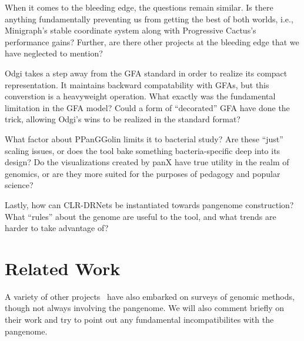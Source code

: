 \documentclass[acmsmall, screen]{acmart}
\begin{document}
When it comes to the bleeding edge, the questions remain similar.
Is there anything fundamentally preventing us from getting the best of both worlds, i.e., Minigraph's stable coordinate system along with Progressive Cactus's performance gains?
Further, are there other projects at the bleeding edge that we have neglected to mention?

Odgi takes a step away from the GFA standard in order to realize its compact representation.
It maintains backward compatability with GFAs, but this converstion is a heavyweight operation.
What exactly was the fundamental limitation in the GFA model?
Could a form of ``decorated'' GFA have done the trick, allowing Odgi's wins to be realized in the standard format?

What factor about PPanGGolin limits it to bacterial study?
Are these ``just'' scaling issues, or does the tool bake something bacteria-specific deep into its design? Do the visualizations created by panX have true utility in the realm of genomics, or are they more suited for the purposes of pedagogy and popular science?

Lastly, how can CLR-DRNets be instantiated towards pangenome construction?
What ``rules'' about the genome are useful to the tool, and what trends are harder to take advantage of?

\section{Related Work}

A variety of other projects~\cite{sailfish, alexandrov,omichessan} have also embarked on surveys of genomic methods, though not always involving the pangenome. We will also comment briefly on their work and try to point out any fundamental incompatibilites with the pangenome.



\end{document}
